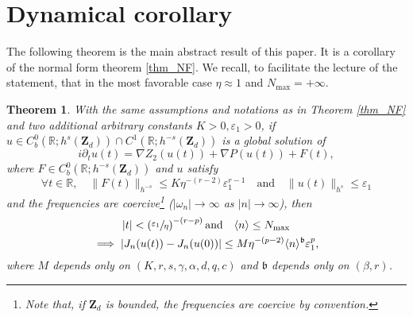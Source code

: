 \documentclass[JEP,XML,SOM,Unicode,NoEqCountersInSection,published]{cedram}
\newtheorem{theorem}{Theorem}[section]
\theoremstyle{definition}
\begin{document}
\section{Dynamical corollary}
\label{sec_dyn_co}

The following theorem is the main abstract result of this paper. It is a corollary of the normal form theorem \ref{thm_NF}. We recall, to facilitate the lecture of the statement, that in the most favorable case $\eta\approx 1$ and $N_{\max}= +\infty$.
\begin{theorem}
\label{thm_main_dyn} With the same assumptions and notations as in Theorem \ref{thm_NF} and two additional arbitrary constants $K>0,\varepsilon_1>0$, if $u\in C^0_b(\mathbb{R};h^s(\mathbf{Z}_d))\cap C^1(\mathbb{R};h^{-s}(\mathbf{Z}_d))$ is a global solution of
\begin{equation}
\label{eq_non_auto}
i\partial_t u(t) = \nabla Z_2(u(t)) + \nabla P(u(t)) + F(t),
\end{equation}
where $F\in C^0_b(\mathbb{R};h^{-s}(\mathbf{Z}_d))$ and $u$ satisfy
\[
\forall t\in \mathbb{R}, \quad \| F(t) \|_{h^{-s}} \leq K \eta^{-(r-2)}\varepsilon_1^{r-1} \quad \text{and} \quad \| u(t) \|_{h^s} \leq \varepsilon_1
\]
and the frequencies are coercive\footnote{Note that, if $\mathbf{Z}_d$ is bounded, the frequencies are coercive by convention.} (\ie $|\omega_n| \to \infty$ as $|n| \to \infty$),
then
\begin{multline}
\label{eq_Willy}
|t|< \left(\sfrac{\varepsilon_1 }{\eta} \right)^{-(r-p)} \text{and} \quad \langle n \rangle \leq N_{\max} \\ \implies |J_n(u(t))-J_n(u(0))|\leq M \eta ^{-(p-2)} \langle n \rangle^{\mathfrak{b}} \varepsilon_1^{p},
\end{multline}
where $M$ depends only on $(K,r,s,\gamma,\alpha,d,q,c)$ and $\mathfrak{b}$ depends only on $(\beta,r)$.
\end{theorem}
\end{document}
